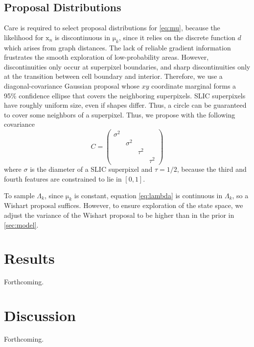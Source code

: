 \documentclass[english]{article}
\newcommand{\+}[1]{\ensuremath{\boldsymbol{\mathrm{#1}}}}
\begin{document}
\subsection{Proposal Distributions}
Care is required to select proposal distributions for \eqref{eq:mu}, because the likelihood for $\+x_n$ is discontinuous in $\+\mu_k$, since it relies on the discrete function $d$ which arises from graph distances. The lack of reliable gradient information frustrates the smooth exploration of low-probability areas. However, discontinuities only occur at superpixel boundaries, and sharp discontinuities only at the transition between cell boundary and interior. Therefore, we use a diagonal-covariance Gaussian proposal whose $xy$ coordinate marginal forms a 95\% confidence ellipse that covers the neighboring superpixels. SLIC superpixels have roughly uniform size, even if shapes differ. Thus, a circle can be guaranteed to cover some neighbors of a superpixel. Thus, we propose with the following covariance
\[
C = \left(\begin{array}{cccc}
    \sigma^{2}\\
     & \sigma^{2}\\
      &  & \tau^{2}\\
       &  &  & \tau^{2}
     \end{array}\right)
\]
where $\sigma$ is the diameter of a SLIC superpixel and $\tau = 1/2$, because the third and fourth features are constrained to lie in $[0, 1]$.

To sample $\Lambda_k$, since $\+\mu_k$ is constant, equation \eqref{eq:lambda} is continuous in $\Lambda_k$, so a Wishart proposal suffices. However, to ensure exploration of the state space, we adjust the variance of the Wishart proposal to be higher than in the prior in \ref{sec:model}.

\section{Results}
Forthcoming.

\section{Discussion}
Forthcoming.



\end{document}
